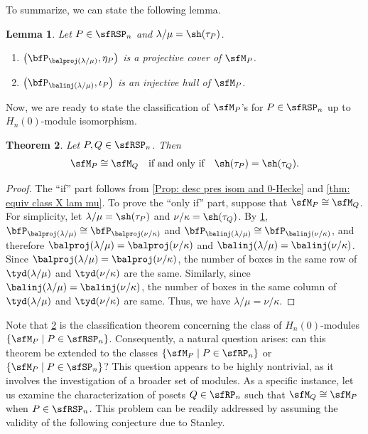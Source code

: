 \documentclass[12pt, reqno]{amsart}
\newtheorem{theorem}{Theorem}[section]
\newtheorem{lemma}[theorem]{Lemma}
\theoremstyle{definition}
\numberwithin{equation}{section} \numberwithin{figure}{section}
\numberwithin{table}{section}
\begin{document}
To summarize, we can state the following lemma.
\begin{lemma}\label{lem: proj cov and inj hull}
Let $P \in \sfRSP_n$ and $\lambda/\mu = \sh(\tau_P)$.
\begin{enumerate}[label = {\rm (\arabic*)}]
\item $\left( \bfP_{\balproj(\lambda/\mu)}, \eta_P \right)$ is a projective cover of $\sfM_P$.
\item $\left(\bfP_{\balinj(\lambda/\mu)}, \iota_P \right)$ is an injective hull of $\sfM_P$.
\end{enumerate}
\end{lemma}





Now, we are ready to state the  classification of $\sfM_P$'s for $P \in \sfRSP_n$ up to $H_n(0)$-module isomorphism.



\begin{theorem}\label{thm: classification}
Let $P, Q \in \sfRSP_n$.
Then
\[
\sfM_{P} \cong \sfM_{Q} \quad \text{if and only if} \quad \sh(\tau_P) = \sh(\tau_Q).
\]
\end{theorem}

\begin{proof}
The ``if'' part follows from \cref{Prop: desc pres isom and 0-Hecke} and \cref{thm: equiv class X lam mu}.
To prove the ``only if'' part, suppose that $\sfM_{P} \cong \sfM_{Q}$.
For simplicity, let $\lambda/\mu = \sh(\tau_{P})$ and $\nu/\kappa = \sh(\tau_{Q})$.
By \cref{lem: proj cov and inj hull}, 
$\bfP_{\balproj(\lambda/\mu)} \cong \bfP_{\balproj(\nu/\kappa)}$ and $\bfP_{\balinj(\lambda/\mu)} 
\cong \bfP_{\balinj(\nu/\kappa)}$,
and therefore $\balproj(\lambda/\mu) = \balproj(\nu/\kappa)$ and $\balinj(\lambda/\mu) = \balinj(\nu/\kappa)$.
Since $\balproj(\lambda/\mu) = \balproj(\nu/\kappa)$, the number of boxes in the same row of $\tyd(\lambda/\mu)$ and $\tyd(\nu/\kappa)$ are the same.
Similarly, since $\balinj(\lambda/\mu) = \balinj(\nu/\kappa)$, 
the number of boxes in the same column of $\tyd(\lambda/\mu)$ and $\tyd(\nu/\kappa)$ are same.
Thus, we have  $\lambda/\mu = \nu/\kappa$.
\end{proof}




Note that \cref{thm: classification} is the classification theorem concerning the class of $H_n(0)$-modules $\{\sfM_P \mid P \in \sfRSP_n\}$. Consequently, a natural question arises: can this theorem be extended to the classes $\{\sfM_P \mid P \in \sfRP_n\}$ or $\{\sfM_P \mid P \in \sfSP_n\}$? This question appears to be highly nontrivial, as it involves the investigation of a broader set of modules. 
As a specific instance, let us examine the characterization of posets $Q \in \sfRP_n$ such that $\sfM_Q \cong \sfM_P$ when $P \in \sfRSP_n$. This problem can be readily addressed by assuming the validity of the following conjecture due to Stanley.
\end{document}
